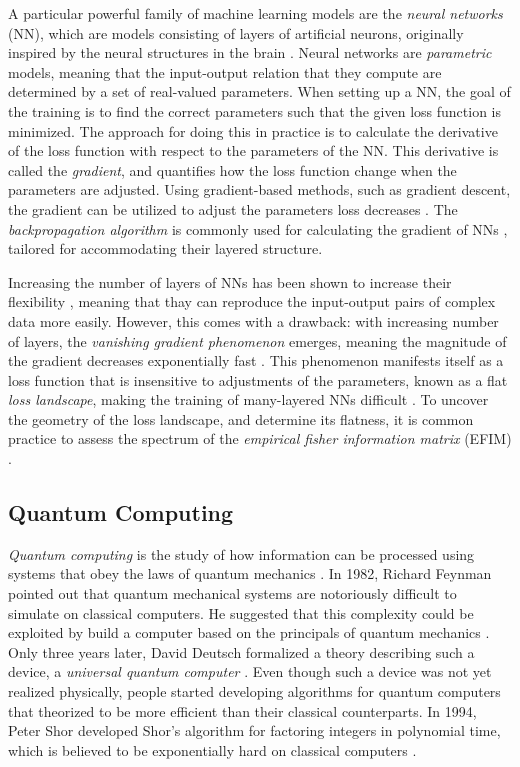 A particular powerful family of machine learning models are the \emph{neural networks} (NN), which are models consisting of layers of artificial neurons, originally inspired by the neural structures in the brain \cite{hands-on}. Neural networks are \emph{parametric} models, meaning that the input-output relation that they compute are determined by a set of real-valued parameters. When setting up a NN, the goal of the training is to find the correct parameters such that the given loss function is minimized. The approach for doing this in practice is to calculate the derivative of the loss function with respect to the parameters of the NN. This derivative is called the \emph{gradient}, and quantifies how the loss function change when the parameters are adjusted. Using gradient-based methods, such as gradient descent, the gradient can be utilized to adjust the parameters loss decreases \cite{hands-on}. The \emph{backpropagation algorithm} is commonly used for calculating the gradient of NNs \cite{hands-on}, tailored for accommodating their layered structure. 

Increasing the number of layers of NNs has been shown to increase their flexibility \cite{raghu2017expressive}, meaning that thay can reproduce the input-output pairs of complex data more easily. However, this comes with a drawback: with increasing number of layers, the \emph{vanishing gradient phenomenon} emerges, meaning the magnitude of the gradient decreases exponentially fast \cite{LeCun2012}. This phenomenon manifests itself as a loss function that is insensitive to adjustments of the parameters, known as a flat \emph{loss landscape}, making the training of many-layered NNs difficult \cite{karakida2019universal}. To uncover the geometry of the loss landscape, and determine its flatness, it is common practice to assess the spectrum of the \emph{empirical fisher information matrix} (EFIM) \cite{karakida2019universal}.


\subsection{Quantum Computing}\label{sec:Quantum Computing Intro}
\emph{Quantum computing} is the study of how information can be processed using systems that obey the laws of quantum mechanics \cite{NielsenQuantum}. In 1982, Richard Feynman pointed out that quantum mechanical systems are notoriously difficult to simulate on classical computers. He suggested that this complexity could be exploited by build a computer based on the principals of quantum mechanics \cite{NielsenQuantum}. Only three years later, David Deutsch formalized a theory describing such a device, a \emph{universal quantum computer} \cite{Deutsch1985QuantumTT}. Even though such a device was not yet realized physically, people started developing algorithms for quantum computers that theorized to be more efficient than their classical counterparts. In 1994, Peter Shor developed Shor's algorithm for factoring integers in polynomial time, which is believed to be exponentially hard on classical computers \cite{Shor_1997}. 

